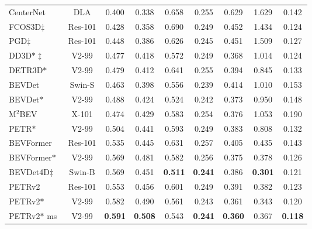 \documentclass[10pt,twocolumn,letterpaper]{article}
\begin{document}
\begin{table*}[t!]
\begin{center}
\begin{tabular}{l|c|ccccccc}
\hline
CenterNet~\cite{zhou2019objects} & DLA &0.400 &0.338 &0.658 &0.255 &0.629 &1.629 &0.142  \\
 FCOS3D$\ddagger$~\cite{wang2021fcos3d} & Res-101 &0.428 &0.358 &0.690 &0.249 &0.452 &1.434 &0.124  \\
 PGD$\ddagger$~\cite{wang2022pgd} & Res-101 &0.448 &0.386 &0.626 &0.245 &0.451 &1.509 &0.127  \\
 DD3D$\ast\ddagger$~\cite{park2021dd3d} & V2-99 &0.477 &0.418  &0.572 &0.249 &0.368 &1.014 &0.124  \\
 DETR3D$\ast$~\cite{wang2022detr3d} & V2-99 &0.479 &0.412  &0.641 &0.255 &0.394 &0.845 &0.133  \\
 BEVDet~\cite{huang2021bevdet} & Swin-S &0.463 &0.398 &0.556 &0.239 &0.414 &1.010 &0.153  \\
 BEVDet$\ast$~\cite{huang2021bevdet} & V2-99 &0.488 &0.424 &0.524 &0.242 &0.373 &0.950 &0.148  \\
 M$^{2}$BEV~\cite{xie2022m} & X-101&0.474 &0.429 &0.583 &0.254 & 0.376 &1.053 &0.190 \\
 PETR$\ast$~\cite{liu2022petr} & V2-99 &0.504 &0.441 &0.593 &0.249 &0.383 &0.808 &0.132  \\
\hline
BEVFormer~\cite{li2022bevformer} & Res-101 &0.535 &0.445 &0.631 &0.257 &0.405 &0.435 &0.143  \\
BEVFormer$\ast$~\cite{li2022bevformer} & V2-99 &0.569 &0.481 &0.582 &0.256 &0.375 &0.378 &0.126  \\
BEVDet4D$\ddagger$~\cite{huang2022bevdet4d} & Swin-B &0.569 &0.451 &\textbf{0.511} &\textbf{0.241} &0.386 &\textbf{0.301} &0.121  \\
PETRv2 & Res-101 &0.553 &0.456 &0.601 &0.249 &0.391 &0.382 &0.123  \\
PETRv2$\ast$ & V2-99 &0.582 &0.490 &0.561 &0.243 &0.361 &0.343 &0.120  \\
PETRv2$\ast$ ms & V2-99 &\textbf{0.591} &\textbf{0.508} &0.543 &\textbf{0.241} &\textbf{0.360} &0.367 &\textbf{0.118}  \\

\hline
\end{tabular}
\end{center}
\end{table*}
\end{document}
